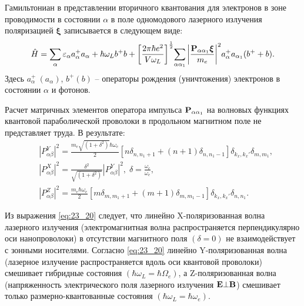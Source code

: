 Гамильтониан в представлении вторичного квантования для электронов в зоне проводимости в состоянии $\alpha $ в поле одномодового лазерного излучения поляризацией ${\mathbf \xi }$ записывается в следующем виде:
\begin{equation} \label{eq:23_10} 
\hat{H}=\sum_{\alpha } {\varepsilon_{\alpha } a^+_{\alpha } a_{\alpha }} + \hbar \omega_L b^+ b + {\left[\frac{2\pi \hbar e^2} {V \omega_L} \right]}^{\frac{1}{2}} {\sum_{\alpha \alpha_1}{\left|\frac{\boldsymbol{\mathbf{P}}_{\alpha \alpha_1} \boldsymbol{\mathbf{\xi}}}{m_e}\right|}}^2 a^+_{\alpha } a_{\alpha_1} (b^+ + b).
\end{equation}
Здесь $a^+_{\alpha }\ (a_{\alpha })$, $b^+ (b)$ -- операторы рождения (уничтожения) электронов в состоянии $\alpha $ и фотонов.

Расчет матричных элементов оператора импульса $\boldsymbol{\mathbf{P}}_{\alpha\alpha_1}$ на волновых функциях квантовой параболической проволоки в продольном магнитном поле \cite{Hashimzade2005} не представляет труда. В результате:
\begin{equation} \label{eq:23_20}
\begin{aligned}
&\left| P^Y_{\alpha \beta }\right|^2=
\frac{m_e \sqrt{\left({1+\delta }^2\right)} \hbar\omega_e}{2} \left[  n \delta_{n,n_1+1} + (n+1) \delta_{n,n_1-1} \right]\delta_{k_x,k_x'}\delta_{m,m_1} , \\
&{\left| P^X_{\alpha \beta }\right|}^2=\frac{\delta^2}{{\sqrt{\left({1+\delta }^2\right)} }}{\left|P^Y_{\alpha \beta }\right|}^2, \;
\delta =\frac{\omega_c}{\omega_e},\\
&{\left| P^Z_{\alpha \beta }\right|}^2=\frac{m_e \hbar\omega_e}{2} \left[ m \delta_{m,m_1+1} + (m+1){\delta }_{m,m_1-1} \right]  \delta_{k_x,k_x'} \delta_{n,n_1}.
\end{aligned}
\end{equation}

Из выражения \eqref{eq:23_20} следует, что линейно X-поляризованная волна лазерного излучения (электромагнитная волна распространяется перпендикулярно оси нанопроволоки) в отсутствии магнитного поля $(\delta =0)$ не взаимодействует с зонными носителями. Согласно \eqref{eq:23_20} линейно Y-поляризованная волна (лазерное излучение распространяется вдоль оси квантовой проволоки) смешивает гибридные состояния $\left( \hbar\omega_L = \hbar\Omega_e \right) $, а Z-поляризованная волна (напряженность электрического поля лазерного излучения $\boldsymbol{\mathbf{E}}\bot \boldsymbol{\mathbf{B}}$) смешивает только размерно-квантованные состояния $ \left( \hbar\omega_L = \hbar\omega_e \right) $.

